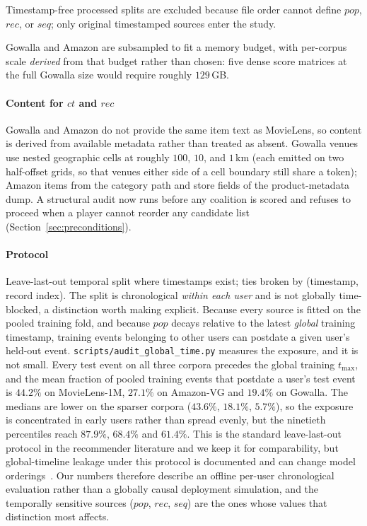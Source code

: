 \documentclass[pdflatex,sn-basic,Numbered]{sn-jnl}
\theoremstyle{plain}
\theoremstyle{definition}
\begin{document}
Timestamp-free processed splits are excluded because file order cannot define
$pop$, $rec$, or $seq$; only original timestamped sources enter the study.

Gowalla and Amazon are subsampled to fit a memory budget, with per-corpus scale
\emph{derived} from that budget rather than chosen: five dense score matrices at
the full Gowalla size would require roughly $129$\,GB.

\paragraph{Content for $ct$ and $rec$}
Gowalla and Amazon do not provide the same item text as MovieLens, so content
is derived from available metadata rather than treated as absent. Gowalla
venues use nested geographic cells at roughly $100$, $10$, and $1$\,km
(each emitted on two half-offset grids, so that venues either side of a cell
boundary still share a token); Amazon items from the category path and store
fields of the product-metadata dump. A structural audit now runs before any
coalition is scored and refuses to proceed when a player cannot reorder any
candidate list (Section~\ref{sec:preconditions}).

\paragraph{Protocol}
Leave-last-out temporal split where timestamps exist; ties broken by
(timestamp, record index). The split is chronological \emph{within each user}
and is not globally time-blocked, a distinction worth making explicit. Because every source is fitted on the pooled training fold, and
because $pop$ decays relative to the latest \emph{global} training timestamp,
training events belonging to other users can postdate a given user's held-out
event. \texttt{scripts/audit\_global\_time.py} measures the exposure, and it is not
small. Every test event on all three corpora precedes the global training
$t_{\max}$, and the mean fraction of pooled training events that postdate a
user's test event is $44.2\%$ on MovieLens-1M, $27.1\%$ on Amazon-VG and
$19.4\%$ on Gowalla. The medians are lower on the sparser corpora ($43.6\%$,
$18.1\%$, $5.7\%$), so the exposure is concentrated in early users rather than
spread evenly, but the ninetieth percentiles reach $87.9\%$, $68.4\%$ and
$61.4\%$. This is the standard leave-last-out protocol in the recommender
literature and we keep it for comparability, but global-timeline leakage under
this protocol is documented and can change model orderings~\citep{ji2023leakage}.
Our numbers therefore describe
an offline per-user chronological evaluation rather than a globally causal
deployment simulation, and the temporally sensitive sources ($pop$, $rec$,
$seq$) are the ones whose values that distinction most affects.
\end{document}
